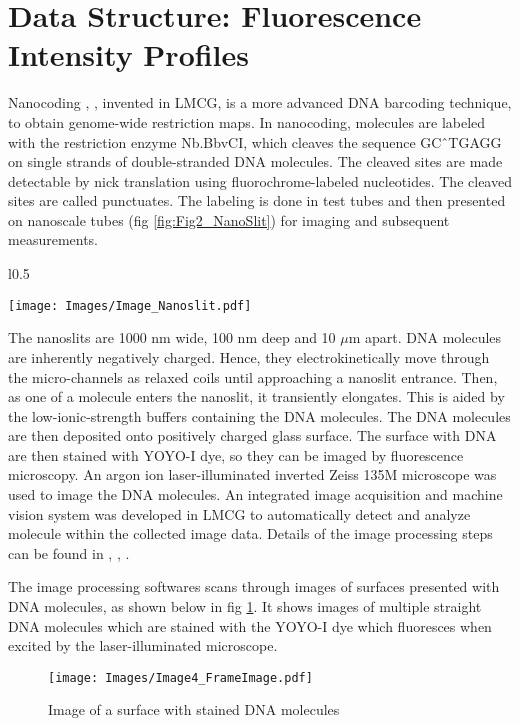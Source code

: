 \section{Data Structure: Fluorescence Intensity Profiles} \label{Ch2}

Nanocoding \cite{Jo_etal_2007_PNAS}, \cite{Jo_etal_2009}, invented in LMCG, is a more advanced DNA barcoding technique, to obtain genome-wide restriction maps. In nanocoding, molecules are labeled with the restriction enzyme Nb.BbvCI, which cleaves the sequence GC\^\ TGAGG on single strands of double-stranded DNA molecules. The cleaved sites are made detectable by nick translation using fluorochrome-labeled nucleotides. The cleaved sites are called punctuates. The labeling is done in test tubes and then presented on nanoscale tubes (fig \ref{fig:Fig2_NanoSlit}) for imaging and subsequent measurements. 
\begin{wrapfigure}{l}{0.5\textwidth}
\begin{center}
\texttt{[image: Images/Image\_Nanoslit.pdf]}
\end{center}
\caption{Nanoslits where DNA molecules are presented}
\label{fig:Fig2_NanoSlit}
\end{wrapfigure}
The nanoslits are 1000 nm wide, 100 nm deep and 10 $\mu$m apart. DNA molecules are inherently negatively charged. Hence, they electrokinetically move through the micro-channels as relaxed coils until approaching a nanoslit entrance. Then, as one of a molecule enters the nanoslit, it transiently elongates. This is aided by the low-ionic-strength buffers containing the DNA molecules. The DNA molecules are then deposited onto positively charged glass surface. The surface with DNA are then stained with YOYO-I dye, so they can be imaged by fluorescence microscopy. An argon ion laser-illuminated inverted Zeiss 135M microscope was used to image the DNA molecules. An integrated image acquisition and machine vision system was developed in LMCG to automatically detect and analyze molecule within the collected image data. Details of the image processing steps can be found in \cite{Dimalanta_etal_2004_AnalChem}, \cite{Jo_etal_2007_PNAS}, \cite{Ravindran_Gupta_2015_GigaScience}. 

The image processing softwares scans through images of surfaces presented with DNA molecules, as shown below in fig \ref{fig:Fig2_FrameImage}. It shows images of multiple straight DNA molecules which are stained with the YOYO-I dye which fluoresces when excited by the laser-illuminated microscope.  
\begin{figure}[h!]
\begin{center}
\texttt{[image: Images/Image4\_FrameImage.pdf]}
\end{center}
\caption{Image of a surface with stained DNA molecules}
\label{fig:Fig2_FrameImage}
\end{figure}

